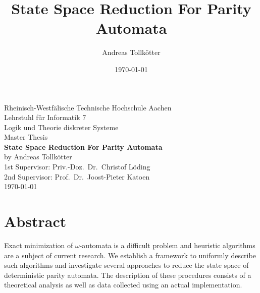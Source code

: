 \title{State Space Reduction For Parity Automata}
\author{Andreas Tollkötter}
\date{\today}

\pagestyle{empty}
\begin{titlepage}
\begin{center}
	\vspace*{\fill}
		\LARGE Rheinisch-Westfälische Technische Hochschule Aachen \\
	\vspace*{1cm}
		\LARGE Lehrstuhl für Informatik 7 \\
		\Large Logik und Theorie diskreter Systeme \\
	\vspace*{2cm}
		\LARGE Master Thesis \\
	\vspace*{5mm}
		\huge \textbf{State Space Reduction For Parity Automata} \\
	\vspace*{1cm}
		\Large by Andreas Tollkötter \\
	\vspace*{5mm}
		\Large 1st Supervisor: Priv.-Doz.\ Dr.\ Christof Löding \\
		\Large 2nd Supervisor: Prof.\ Dr.\ Joost-Pieter Katoen \\
	\vspace*{2cm}
		\large \today 
	\vspace*{\fill}
\end{center}
\end{titlepage}







\chapter*{Abstract}
Exact minimization of $\omega$-automata is a difficult problem and heuristic algorithms are a subject of current research. We establish a framework to uniformly describe such algorithms and investigate several approaches to reduce the state space of deterministic parity automata. The description of these procedures consists of a theoretical analysis as well as data collected using an actual implementation.




